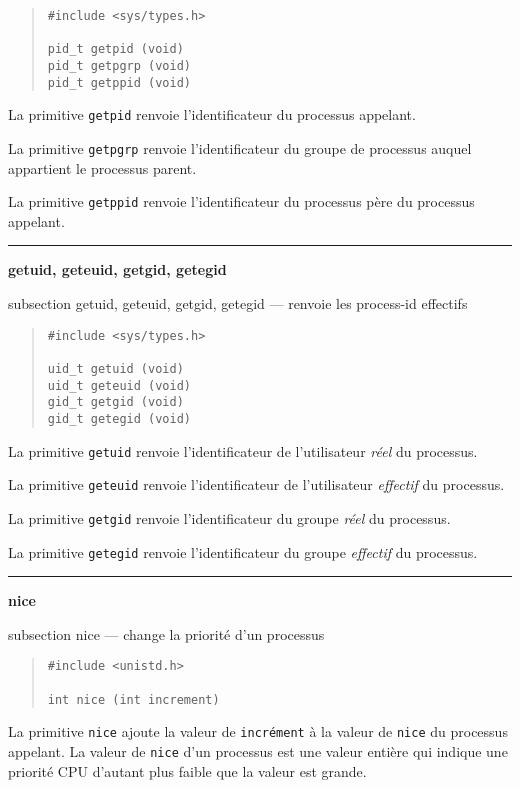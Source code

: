 \documentclass [twoside] {report}
\newcommand {\primitive} [1]
    {
	{\large \bf #1}
	\addcontentsline {toc} {subsection} {#1}
    }
\newcommand {\separation}
    {
	\vspace {7mm}
	\nopagebreak
	\hrule
    }
\begin{document}
\begin {quote}
\begin {verbatim}
#include <sys/types.h>

pid_t getpid (void)
pid_t getpgrp (void)
pid_t getppid (void)
\end{verbatim}
\end {quote}

La primitive {\tt getpid} renvoie l'identificateur
du processus appelant.

La primitive {\tt getpgrp} renvoie l'identificateur
du groupe de processus auquel appartient le
processus parent.

La primitive {\tt getppid} renvoie l'identificateur
du processus père du processus appelant.




\separation
\primitive {getuid, geteuid, getgid, getegid} --- renvoie les process-id effectifs

\begin {quote}
\begin {verbatim}
#include <sys/types.h>

uid_t getuid (void)
uid_t geteuid (void)
gid_t getgid (void)
gid_t getegid (void)
\end{verbatim}
\end {quote}

La primitive {\tt getuid} renvoie l'identificateur
de l'utilisateur {\it réel} du processus.

La primitive {\tt geteuid} renvoie l'identificateur
de l'utilisateur {\it effectif} du processus.

La primitive {\tt getgid} renvoie l'identificateur
du groupe {\it réel} du processus.

La primitive {\tt getegid} renvoie l'identificateur
du groupe {\it effectif} du processus.




\separation
\primitive {nice} --- change la priorité d'un processus

\begin {quote}
\begin {verbatim}
#include <unistd.h>

int nice (int increment)
\end{verbatim}
\end {quote}

La primitive {\tt nice} ajoute la valeur de
{\tt incrément} à la valeur de {\tt nice} du processus
appelant. La valeur de {\tt nice} d'un processus est
une valeur entière qui indique une priorité
CPU d'autant plus faible que la valeur est grande.
\end{document}
